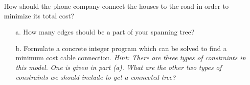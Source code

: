 \documentclass[11pt]{article}
\theoremstyle{definition}
\begin{document}
How should the phone company connect the houses to the road in order to minimize its
total cost?

\begin{enumerate}
\item[a.] How many edges should be a part of your spanning tree?
\item[b.] Formulate a concrete integer program which can be solved to find a minimum cost cable connection. \emph{Hint: There are three types of constraints in this model. One is given in part (a). What are the other two types of constraints we should include to get a connected tree?}
\end{enumerate}
\end{document}
